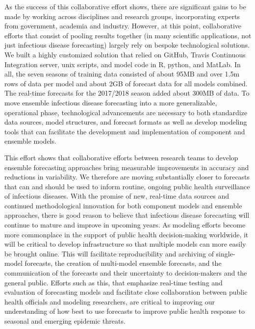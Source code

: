 \documentclass{article}\usepackage[]{graphicx}\usepackage[]{color}
\begin{document}
As the success of this collaborative effort shows, there are significant gains to be made by working across disciplines and research groups, incorporating experts from government, academia and industry. 
However, at this point, collaborative efforts that consist of pooling results together (in many scientific applications, not just infectious disease forecasting) largely rely on bespoke technological solutions.
We built a highly customized solution that relied on GitHub, Travis Continuous Integration server, unix scripts, and model code in R, python, and MatLab. 
In all, the seven seasons of training data consisted of about 95MB and over 1.5m rows of data per model and about 2GB of forecast data for all models combined.
The real-time forecasts for the 2017/2018 season added about 300MB of data.
To move ensemble infectious disease forecasting into a more generalizable, operational phase, technological advancements are necessary to both standardize data sources, model structures, and forecast formats as well as develop modeling tools that can facilitate the development and implementation of component and ensemble models.

This effort shows that collaborative efforts between research teams to develop ensemble forecasting approaches bring measurable improvements in accuracy and reductions in variability.
We therefore are moving substantially closer to forecasts that can and should be used to inform routine, ongoing public health surveillance of infectious diseases.
With the promise of new, real-time data sources and continued methodological innovation for both component models and ensemble approaches, there is good reason to believe that infectious disease forecasting will continue to mature and improve in upcoming years.
As modeling efforts become more commonplace in the support of public health decision-making worldwide, it will be critical to develop infrastructure so that multiple models can more easily be brought online.
This will facilitate reproducibility and archiving of single-model forecasts, the creation of multi-model ensemble forecasts, and the communication of the forecasts and their uncertainty to decision-makers and the general public.
Efforts such as this, that emphasize real-time testing and evaluation of forecasting models and facilitate close collaboration between public health officials and modeling researchers, are critical to improving our understanding of how best to use forecasts to improve public health response to seasonal and emerging epidemic threats.
\end{document}
